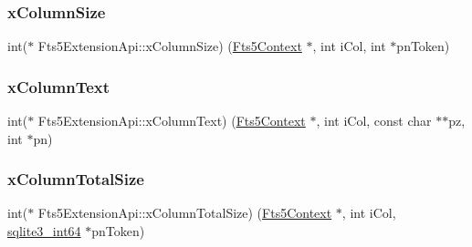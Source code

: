 \mbox{\label{struct_fts5_extension_api_aefe6eb4685546e58f056a61da39a2bcb}} 
\subsubsection{\texorpdfstring{xColumnSize}{xColumnSize}}
{\footnotesize\ttfamily int($\ast$ Fts5\+Extension\+Api\+::x\+Column\+Size) (\mbox{\hyperlink{sqlite3_8h_a97821b95ebebd43db901977ffd5b26bc}{Fts5\+Context}} $\ast$, int i\+Col, int $\ast$pn\+Token)}

\mbox{\label{struct_fts5_extension_api_a03c7fcd31a751fc34d25e5288045f91d}} 
\subsubsection{\texorpdfstring{xColumnText}{xColumnText}}
{\footnotesize\ttfamily int($\ast$ Fts5\+Extension\+Api\+::x\+Column\+Text) (\mbox{\hyperlink{sqlite3_8h_a97821b95ebebd43db901977ffd5b26bc}{Fts5\+Context}} $\ast$, int i\+Col, const char $\ast$$\ast$pz, int $\ast$pn)}

\mbox{\label{struct_fts5_extension_api_a096e79406ae03df9796a2082d0ac8269}} 
\subsubsection{\texorpdfstring{xColumnTotalSize}{xColumnTotalSize}}
{\footnotesize\ttfamily int($\ast$ Fts5\+Extension\+Api\+::x\+Column\+Total\+Size) (\mbox{\hyperlink{sqlite3_8h_a97821b95ebebd43db901977ffd5b26bc}{Fts5\+Context}} $\ast$, int i\+Col, \mbox{\hyperlink{sqlite3_8h_a0a4d3e6c1ad46f90e746b920ab6ca0d2}{sqlite3\+\_\+int64}} $\ast$pn\+Token)}

\mbox{\label{struct_fts5_extension_api_a63ba9aaf30fe9fe5fbcd1541ff38abff}} 
